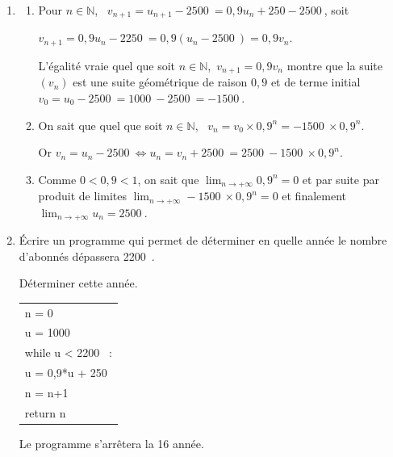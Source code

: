 \documentclass[10pt]{article}
\providecommand{\N}{\mathbb{N}}
\providecommand{\np}[2][]{{#2~#1}}
\begin{document}
\begin{enumerate}
\begin{enumerate}
La relation est vraie au rang $0$ et si elle est vraie au rang $n \in \N$, elle est vraie au rang $n + 1$ : d'après le principe de récurrence : quel que soit $n \in \N$, \, $u_n \leqslant \np{2500}$.
		\item 
Soit $n \in \N$, on a $u_{n+1} - u_n = 0,9u_n + 250 - u_n = -0,1u_n + 250$.

Or d'après la question précédente : $u_n \leqslant \np{2500}$, puis $0,1u_n \leqslant 0,1 \times \np{2500}$ ou encore 

$0,1u_n \leqslant 250$, soit en prenant les opposés : $- 250 \leqslant - 0,1u_n$ et en ajoutant à chaque membre 250 : $0 \leqslant -0,1u_n + 250$.

On a donc pour $n \in \N$, \, $u_{n+1} - u_n \geqslant 0$ ou $u_{n+1}  \geqslant u_n$ : la suite $\left(u_n\right)$ est croissante.
		\item 
La suite $\left(u_n\right)$ est croissante (d'après 4. b.) et majorée par \np{2500} (d'après 4. a.) : elle converge donc vers une limite inférieure ou égale à \np{2500}.
	\end{enumerate}
\item 
	\begin{enumerate}
		\item 
		Pour $n \in \N$, \, $v_{n+1} = u_{n+1} - \np{2500} = 0,9u_n + 250 - \np{2500}$, soit 
		
$v_{n+1} = 0,9u_n - \np{2250} = 0,9\left(u_n  - \np{2500} \right) = 0,9v_n$.

L'égalité vraie quel que soit $n \in \N$,\, $v_{n+1} = 0,9v_n$ montre que la suite $\left(v_n\right)$ est une suite géométrique de raison $0,9$ et de terme initial $v_0 = u_0 - \np{2500} = \np{1000} - \np{2500}  =  \np{- 1500}$.
		\item 
On sait que quel que soit $n \in \N$, \, $v_n = v_0 \times 0,9^n = - \np{1500}\times 0,9^n$.
		
Or $v_n = u_n - \np{2500} \iff u_n = v_n + \np{2500}  = \np{2500} - \np{1500}\times 0,9^n$.
		

		\item 
		Comme $0 < 0,9 < 1$, on sait que $\displaystyle\lim_{n \to + \infty}0,9^n = 0$ et par suite par produit de limites $\displaystyle\lim_{n \to + \infty}- \np{1500}\times 0,9^n = 0$ et finalement $\displaystyle\lim_{n \to + \infty}u_n = \np{2500}.$
	\end{enumerate}
\item Écrire un programme qui permet de déterminer en quelle année le nombre d'abonnés dépassera \np{2200}.

Déterminer cette année.
\begin{center}
\begin{tabular}{|l|}\hline
n = 0\\
u = \np{1000}\\
\quad while u < \np{2200} :\\
\qquad  u = 0,9*u + 250\\
\qquad n = n+1\\
\quad return n\\ \hline
\end{tabular}
\end{center}

Le programme s'arrêtera la 16 année.
\end{enumerate}

\bigskip
\end{document}
